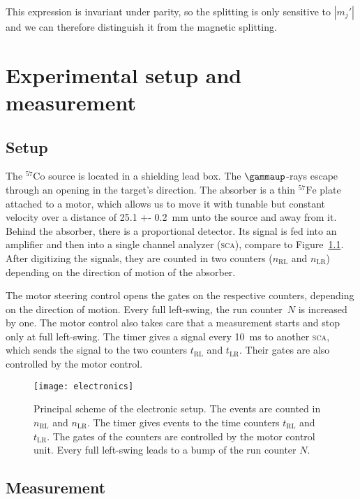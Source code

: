 \documentclass[11pt, english, fleqn, DIV=15, headinclude, BCOR=2cm]{scrreprt}
\newcommand\tRL{t_\text{RL}}
\newcommand\tLR{t_\text{LR}}
\newcommand\nRL{n_\text{RL}}
\newcommand\nLR{n_\text{LR}}
\begin{document}
This expression is invariant under parity, so the splitting is only sensitive
to $|m_j'|$ and we can therefore distinguish it from the magnetic splitting.

\parencite[33, 34]{Schatz/Nukleare_Festkoerperphysik}

\chapter{Experimental setup and measurement}

\section{Setup}

The $^{57}\mathrm{Co}$ source is located in a shielding lead box. The
$\gammaup$-rays escape through an opening in the target's direction. The
absorber is a thin $^{57}\mathrm{Fe}$ plate attached to a motor, which allows
us to move it with tunable but constant velocity over a distance of \SI{25.1 +-
0.2}{\milli\meter} unto the source and away from it. Behind the absorber, there
is a proportional detector. Its signal is fed into an amplifier and then into a
single channel analyzer (\textsc{sca}), compare to
Figure~\ref{fig:electronics}. After digitizing the signals, they are counted in
two counters ($n_\text{RL}$ and $n_\text{LR}$) depending on the direction of
motion of the absorber.

The motor steering control opens the gates on the respective counters,
depending on the direction of motion. Every full left-swing, the run
counter~$N$ is increased by one. The motor control also takes care that a
measurement starts and stop only at full left-swing. The timer gives a signal
every \SI{10}{\milli\second} to another \textsc{sca}, which sends the signal to
the two counters $t_\text{RL}$ and $t_\text{LR}$. Their gates are also
controlled by the motor control.

\begin{figure}
    \centering
    \texttt{[image: electronics]}
    \caption{%
        Principal scheme of the electronic setup. The events are counted in
        $\nRL$ and $\nLR$. The timer gives events to the time counters $\tRL$
        and $\tLR$. The gates of the counters are controlled by the motor
        control unit. Every full left-swing leads to a bump of the run counter
        $N$.
    }
    \label{fig:electronics}
\end{figure}

\section{Measurement}
\end{document}
